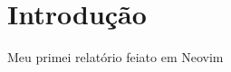 \documentclass{udesc_relatorio}
\begin{document}
\pretextual
\imprimircapa
\imprimirfolhaderosto*







\chapter{Introdução}
Meu primei relatório feiato em Neovim
\end{document}
